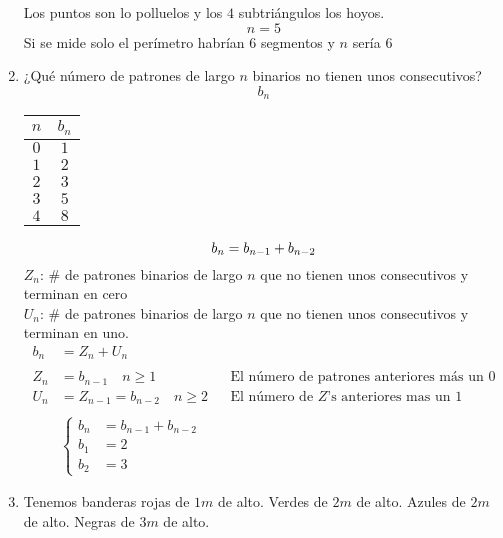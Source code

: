 \documentclass[../main.tex]{subfiles}
\begin{document}
\begin{enumerate}
\begin{figure}[H]
\begin{center}
			\end{center}
		\end{figure}
		Los puntos son lo polluelos y los $4$ subtriángulos los hoyos.
		\[
			\boxed{n=5}
		\]
		Si se mide solo el perímetro habrían 6 segmentos y $n$ sería $6$
	\item ¿Qué número de patrones de largo $n$ binarios no tienen unos consecutivos?
		\[
			b_n
		\]
		\begin{center}
			\begin{tabular}{c|c}
				$n$ & $b_n$\\
				\hline
				$0$ & $1$\\
				$1$ & $2$\\
				$2$ & $3$\\
				$3$ & $5$\\
				$4$ & $8$\\
			\end{tabular}
		\end{center}
		\[
			b_n = b_{n-1} + b_{n-2}\\
		\]
		$Z_n$: \# de patrones binarios de largo $n$ que no tienen unos consecutivos y terminan
		en cero\\
		$U_n$: \# de patrones binarios de largo $n$ que no tienen unos consecutivos y terminan
		en uno.
		\begin{align*}
			b_n &= Z_n + U_n\\
			\\
			Z_n &= b_{n-1}\quad n \geq 1 && \text{El número de patrones anteriores más un $0$}\\
			U_n &= Z_{n-1}=b_{n-2}\quad n \geq 2 && \text{El número de $Z$'s anteriores mas un $1$}\\
			\\
			&\begin{cases}
				b_n &= b_{n-1}+b_{n-2}\\
				b_1 &= 2\\
				b_2 &= 3
			\end{cases}
		\end{align*}
	\item Tenemos banderas rojas de $1m$ de alto.
		Verdes de $2m$ de alto.
		Azules de $2m$ de alto.
		Negras de $3m$ de alto.


\end{enumerate}
\end{document}
